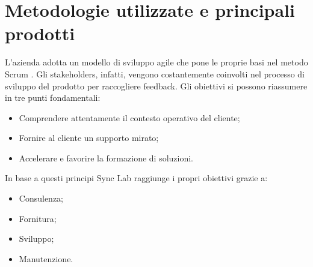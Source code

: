 \section{Metodologie utilizzate e principali prodotti}
L’azienda adotta un modello di sviluppo agile che pone le proprie basi nel metodo Scrum \cite{scrum}. Gli stakeholders, infatti, vengono costantemente coinvolti nel processo di
sviluppo del prodotto per raccogliere feedback. Gli obiettivi si possono riassumere in tre punti fondamentali:
\begin{itemize}
	\item Comprendere attentamente il contesto operativo del cliente; 
	\item Fornire al cliente un supporto mirato; 
	\item Accelerare e favorire la formazione di soluzioni. 
\end{itemize}
In base a questi principi Sync Lab raggiunge i propri obiettivi grazie a:
\begin{itemize}
	\item Consulenza; 
	\item Fornitura; 
	\item Sviluppo; 
	\item Manutenzione. 
\end{itemize}

